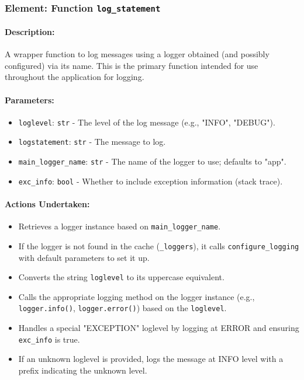 \documentclass{article}
\begin{document}
\subsubsection{Element: Function \texttt{log\_statement}}
\paragraph{Description:} A wrapper function to log messages using a logger obtained (and possibly configured) via its name. This is the primary function intended for use throughout the application for logging.
\paragraph{Parameters:}
\begin{itemize}
    \item \texttt{loglevel}: \texttt{str} - The level of the log message (e.g., "INFO", "DEBUG").
    \item \texttt{logstatement}: \texttt{str} - The message to log.
    \item \texttt{main\_logger\_name}: \texttt{str} - The name of the logger to use; defaults to "app".
    \item \texttt{exc\_info}: \texttt{bool} - Whether to include exception information (stack trace).
\end{itemize}
\paragraph{Actions Undertaken:}
\begin{itemize}
    \item Retrieves a logger instance based on \texttt{main\_logger\_name}.
    \item If the logger is not found in the cache (\texttt{\_loggers}), it calls \texttt{configure\_logging} with default parameters to set it up.
    \item Converts the string \texttt{loglevel} to its uppercase equivalent.
    \item Calls the appropriate logging method on the logger instance (e.g., \texttt{logger.info()}, \texttt{logger.error()}) based on the \texttt{loglevel}.
    \item Handles a special "EXCEPTION" loglevel by logging at ERROR and ensuring \texttt{exc\_info} is true.
    \item If an unknown loglevel is provided, logs the message at INFO level with a prefix indicating the unknown level.
\end{itemize}
\end{document}
